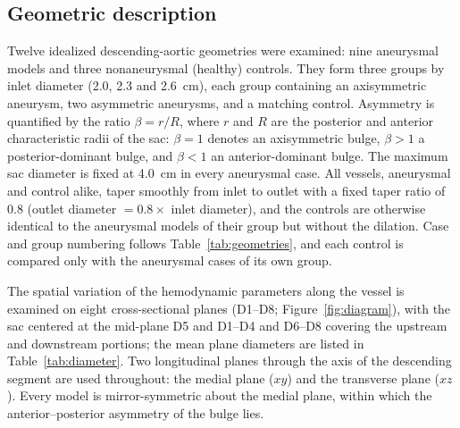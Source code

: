 \documentclass[12pt,a4paper]{article}
\theoremstyle{definition}
\numberwithin{equation}{section}
\begin{document}
\subsection{\label{Geometric Description}Geometric description}
Twelve idealized descending-aortic geometries were examined: nine aneurysmal
models and three nonaneurysmal (healthy) controls. They form three groups by
inlet diameter (2.0, 2.3 and 2.6~cm), each group containing an axisymmetric
aneurysm, two asymmetric aneurysms, and a matching control. Asymmetry is
quantified by the ratio $\beta = r/R$, where $r$ and $R$ are the posterior and
anterior characteristic radii of the sac: $\beta = 1$ denotes an axisymmetric
bulge, $\beta > 1$ a posterior-dominant bulge, and $\beta < 1$ an
anterior-dominant bulge. The maximum sac diameter is fixed at 4.0~cm in every
aneurysmal case. All vessels, aneurysmal and control alike, taper smoothly from
inlet to outlet with a fixed taper ratio of 0.8 (outlet diameter $=0.8\times$
inlet diameter), and the controls are otherwise identical to the aneurysmal
models of their group but without the dilation. Case and group numbering follows
Table~\ref{tab:geometries}, and each control is compared only with the
aneurysmal cases of its own group.

The spatial variation of the hemodynamic parameters along the vessel is examined
on eight cross-sectional planes (D1--D8; Figure~\ref{fig:diagram}), with the sac
centered at the mid-plane D5 and D1--D4 and D6--D8 covering the upstream and
downstream portions; the mean plane diameters are listed in
Table~\ref{tab:diameter}. Two longitudinal planes through the axis of the
descending segment are used throughout: the medial plane ($xy$) and the
transverse plane ($xz$). Every model is mirror-symmetric about the medial plane,
within which the anterior--posterior asymmetry of the bulge lies.
\end{document}
